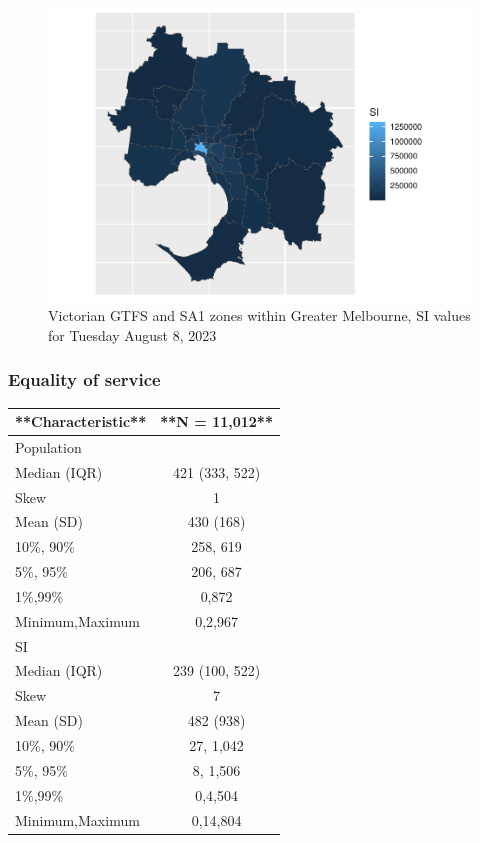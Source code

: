 \documentclass[preprint, 3p,
authoryear]{elsarticle} %
\begin{document}
\begin{figure}
\centering
\includegraphics{Leveraging_GTFS_to_assess_transit_supply_Transport_Geography_files/figure-latex/map_by_sa3-1.pdf}
\caption{Victorian GTFS and SA1 zones within Greater Melbourne, SI
values for Tuesday August 8, 2023}
\end{figure}

\hypertarget{equality-of-service}{%
\subsubsection{Equality of service}\label{equality-of-service}}

\begin{tabular}{l|c}
\hline
**Characteristic** & **N = 11,012**\\
\hline
Population & \\
\hline
Median (IQR) & 421 (333, 522)\\
\hline
Skew & 1\\
\hline
Mean (SD) & 430 (168)\\
\hline
10\%, 90\% & 258, 619\\
\hline
5\%, 95\% & 206, 687\\
\hline
1\%,99\% & 0,872\\
\hline
Minimum,Maximum & 0,2,967\\
\hline
SI & \\
\hline
Median (IQR) & 239 (100, 522)\\
\hline
Skew & 7\\
\hline
Mean (SD) & 482 (938)\\
\hline
10\%, 90\% & 27, 1,042\\
\hline
5\%, 95\% & 8, 1,506\\
\hline
1\%,99\% & 0,4,504\\
\hline
Minimum,Maximum & 0,14,804\\
\hline
\end{tabular}
\end{document}
